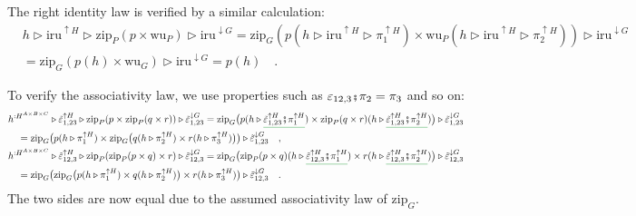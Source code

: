 The right identity law is verified by a similar calculation:
\begin{align*}
 & h\triangleright\text{iru}^{\uparrow H}\triangleright\text{zip}_{P}(p\times\text{wu}_{P})\triangleright\text{iru}^{\downarrow G}=\text{zip}_{G}(p(h\triangleright\text{iru}^{\uparrow H}\triangleright\pi_{1}^{\uparrow H})\times\text{wu}_{P}(h\triangleright\text{iru}^{\uparrow H}\triangleright\pi_{2}^{\uparrow H}))\triangleright\text{iru}^{\downarrow G}\\
 & =\text{zip}_{G}(p(h)\times\text{wu}_{G})\triangleright\text{iru}^{\downarrow G}=p(h)\quad.
\end{align*}

To verify the associativity law, we use properties such as $\varepsilon_{12,3}\bef\pi_{2}=\pi_{3}$
and so on:
\begin{align*}
 & h^{:H^{A\times B\times C}}\triangleright\tilde{\varepsilon}_{1,23}^{\uparrow H}\triangleright\text{zip}_{P}(p\times\text{zip}_{P}(q\times r))\triangleright\tilde{\varepsilon}_{1,23}^{\downarrow G}=\text{zip}_{G}\big(p(h\triangleright\gunderline{\tilde{\varepsilon}_{1,23}^{\uparrow H}\bef\pi_{1}^{\uparrow H}})\times\text{zip}_{P}(q\times r)(h\triangleright\gunderline{\tilde{\varepsilon}_{1,23}^{\uparrow H}\bef\pi_{2}^{\uparrow H}})\big)\triangleright\tilde{\varepsilon}_{1,23}^{\downarrow G}\\
 & \quad=\text{zip}_{G}\big(p(h\triangleright\pi_{1}^{\uparrow H})\times\text{zip}_{G}\big(q(h\triangleright\pi_{2}^{\uparrow H})\times r(h\triangleright\pi_{3}^{\uparrow H})\big)\big)\triangleright\tilde{\varepsilon}_{1,23}^{\downarrow G}\quad,\\
 & h^{:H^{A\times B\times C}}\triangleright\tilde{\varepsilon}_{12,3}^{\uparrow H}\triangleright\text{zip}_{P}(\text{zip}_{P}(p\times q)\times r)\triangleright\tilde{\varepsilon}_{12,3}^{\downarrow G}=\text{zip}_{G}\big(\text{zip}_{P}(p\times q)(h\triangleright\gunderline{\tilde{\varepsilon}_{12,3}^{\uparrow H}\bef\pi_{1}^{\uparrow H}})\times r(h\triangleright\gunderline{\tilde{\varepsilon}_{12,3}^{\uparrow H}\bef\pi_{2}^{\uparrow H}})\big)\triangleright\tilde{\varepsilon}_{12,3}^{\downarrow G}\\
 & \quad=\text{zip}_{G}\big(\text{zip}_{G}\big(p(h\triangleright\pi_{1}^{\uparrow H})\times q(h\triangleright\pi_{2}^{\uparrow H})\big)\times r(h\triangleright\pi_{3}^{\uparrow H})\big)\triangleright\tilde{\varepsilon}_{12,3}^{\downarrow G}\quad.
\end{align*}
The two sides are now equal due to the assumed associativity law of
$\text{zip}_{G}$.

